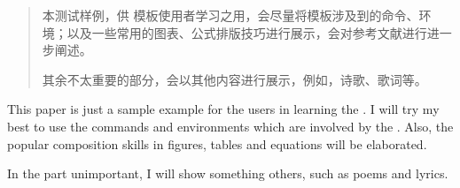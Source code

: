 \begin{abstract}
  本测试样例，供\XDUthesis{} 模板使用者学习之用，会尽量将模板涉及到的命令、环境；以及一些常用的图表、公式排版技巧进行展示，会对参考文献进行进一步阐述。
  
  其余不太重要的部分，会以其他内容进行展示，例如，诗歌、歌词等。

\end{abstract}

\begin{enabstract}
  This paper is just a sample example for the users in learning the \XDUthesis. I will try my best to use the commands and environments which are involved by the \XDUthesis. Also, the popular composition skills in figures, tables and equations will be elaborated.
  
  In the part unimportant, I will show something others, such as poems and lyrics.

\end{enabstract}
